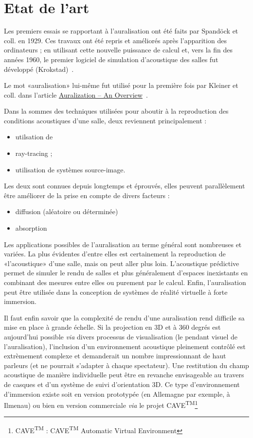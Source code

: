 \chapter{Etat de l'art}

Les premiers essais se rapportant à l'auralisation ont été faits par Spandöck et coll. en 1929.
Ces travaux ont été repris et améliorés après l'apparition des ordinateurs ; en utilisant cette nouvelle puissance de
calcul et, vers la fin des années 1960, le premier logiciel de simulation d'acoustique des salles fut développé
(Krokstad)~\cite{Vor08}.

Le mot «auralisation» lui-même fut utilisé pour la première fois par Kleiner et coll. dans l'article
\underline{Auralization -- An Overview}~\cite{Kle93}.

Dans la sommes des techniques utilisées pour aboutir à la reproduction des conditions acoustiques d'une salle, deux
reviennent principalement :

\begin{itemize}
    \item utilsation de \item{ray-tracing} ;
    \item utilisation de systèmes source-image.
\end{itemize}

Les deux sont connues depuis longtemps et éprouvés, elles peuvent parallèlement être améliorer de la prise en compte de
divers facteurs :

\begin{itemize}
    \item diffusion (aléatoire ou déterminée)
    \item absorption
\end{itemize}

Les applications possibles de l'auralisation au terme général sont nombreuses et variées. La plus évidentes d'entre
elles est certainement la reproduction de «l'acoustique» d'une salle, mais on peut aller plus loin. L'acoustique
prédictive permet de simuler le rendu de salles et plus généralement d'espaces inexistants en combinant des mesures
entre elles ou purement par le calcul. Enfin, l'auralisation peut être utilisée dans la conception de systèmes de
réalité virtuelle à forte immersion.

Il faut enfin savoir que la complexité de rendu d'une auralisation rend difficile sa mise en place à grande échelle. Si
la projection en 3D et à 360 degrés est aujourd'hui possible \textit{via} divers processus de visualisation (le pendant
visuel de l'auralisation), l'inclusion d'un environnement acoustique pleinement contrôlé est extrèmement complexe et
demanderait un nombre impressionnant de haut parleurs (et ne pourrait s'adapter à chaque spectateur). Une restitution du
champ acoustique de manière individuelle peut être en revanche envisageable au travers de casques et d'un système de
suivi d'orientation 3D. Ce type d'environnement d'immersion existe soit en version prototypée (en Allemagne par exemple,
à Ilmenau) ou bien en version commerciale \textit{via} le projet
CAVE\textsuperscript{TM}\footnote{CAVE\textsuperscript{\textsc{TM}} :
    CAVE\textsuperscript{\textsc{TM}} Automatic Virtual
Environment}
